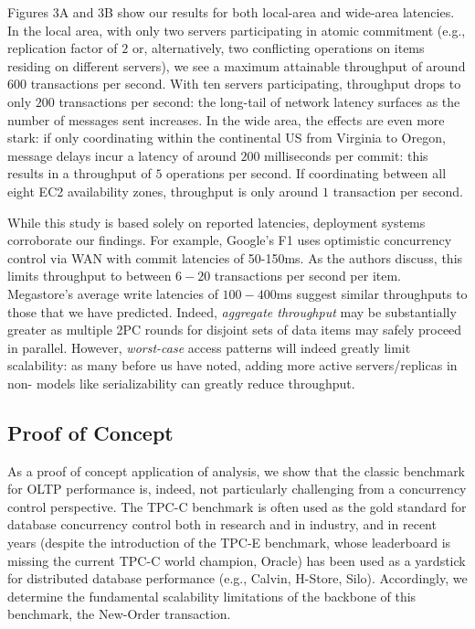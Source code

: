 Figures 3A and 3B show our results for both local-area and wide-area
latencies.  In the local area, with only two servers participating in
atomic commitment (e.g., replication factor of $2$ or, alternatively,
two conflicting operations on items residing on different servers), we
see a maximum attainable throughput of around $600$ transactions per
second. With ten servers participating, throughput drops to only $200$
transactions per second: the long-tail of network latency surfaces as
the number of messages sent increases. In the wide area, the effects
are even more stark: if only coordinating within the continental US
from Virginia to Oregon, message delays incur a latency of around
$200$ milliseconds per commit: this results in a throughput of $5$
operations per second. If coordinating between all eight EC2
availability zones, throughput is only around $1$ transaction per
second.

While this study is based solely on reported latencies, deployment
systems corroborate our findings. For example, Google's F1 uses
optimistic concurrency control via WAN with commit latencies of
50-150ms. As the authors discuss, this limits throughput to between
$6-20$ transactions per second per item. Megastore's average write
latencies of $100-400$ms suggest similar throughputs to those that we
have predicted. Indeed, \textit{aggregate throughput} may be
substantially greater as multiple 2PC rounds for disjoint sets of data
items may safely proceed in parallel. However, \textit{worst-case}
access patterns will indeed greatly limit scalability: as many before
us have noted, adding more active servers/replicas in non-\cfree
models like serializability can greatly reduce throughput.

\subsection{Proof of Concept}

As a proof of concept application of \cfreedom analysis, we show that
the classic benchmark for OLTP performance is, indeed, not
particularly challenging from a concurrency control perspective. The
TPC-C benchmark is often used as the gold standard for database
concurrency control both in research and in industry, and in recent
years (despite the introduction of the TPC-E benchmark, whose
leaderboard is missing the current TPC-C world champion, Oracle) has
been used as a yardstick for distributed database performance (e.g.,
Calvin, H-Store, Silo). Accordingly, we determine the fundamental
scalability limitations of the backbone of this benchmark, the
New-Order transaction.


